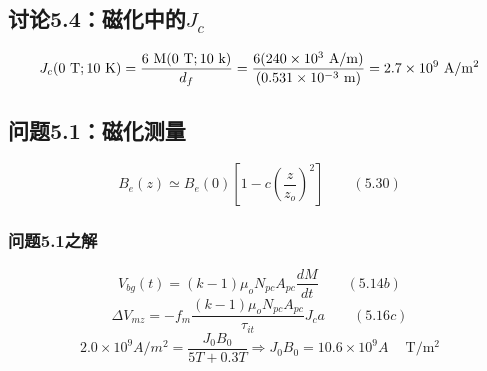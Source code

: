 \subsection{讨论5.4：磁化中的$J_c$}
\begin{equation}%
J_{c}(0\ \mathrm{T};10\ \mathrm{K})=\frac{6\ \mathrm{M}(0\ \mathrm{T};10\ \mathrm{k})}{d_{f}}\\
=\frac{6(240\times10^{3}\ \mathrm{A/m})}{(0.531\times10^{-3}\ \mathrm{m})}\\
=2.7\times10^{9}\ \mathrm{A/m^{2}}
\end{equation}


\subsection{问题5.1：磁化测量}

\begin{equation}%
B_{e}(z)\simeq B_{e}(0)[1-c(\frac{z}{z_{o}})^{2}]\qquad(5.30)
\end{equation}

\subsubsection{问题5.1之解}

\begin{equation}%
V_{bg}(t)=(k-1)\mu_{o}N_{pc}A_{pc}\frac{dM}{dt}\qquad(5.14b)
\end{equation}
\begin{equation}%
\Delta V_{mz}=-f_{m}\frac{(k-1)\mu_{o}N_{pc}A_{pc}}{\tau_{it}}J_{c}a\qquad(5.16c)
\end{equation}
\begin{equation}%
2.0\times10^{9}A/m^{2}=\frac{J_{0}B_{0}}{5T+0.3T}\Rightarrow J_{0}B_{0}=10.6\times10^{9}A\quad\ \mathrm{T/m^{2}}
\end{equation}

